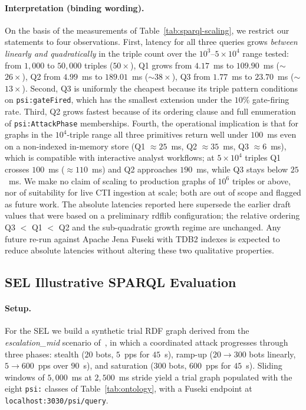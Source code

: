 \documentclass[runningheads]{llncs}
\begin{document}
\paragraph{Interpretation (binding wording).} On the basis of the
measurements of Table~\ref{tab:sparql-scaling}, we restrict our
statements to four observations. First, latency for all three queries
grows \emph{between linearly and quadratically} in the triple count
over the $10^{3}$--$5\times 10^{4}$ range tested: from $1{,}000$ to
$50{,}000$ triples ($50\times$), Q1 grows from $4.17$~ms to
$109.90$~ms ($\sim$$26\times$), Q2 from $4.99$~ms to $189.01$~ms
($\sim$$38\times$), Q3 from $1.77$~ms to $23.70$~ms ($\sim$$13\times$).
Second, Q3 is uniformly the cheapest because its triple pattern
conditions on \texttt{psi:gateFired}, which has the smallest extension
under the $10\%$ gate-firing rate. Third, Q2 grows fastest because of
its ordering clause and full enumeration of \texttt{psi:AttackPhase}
memberships. Fourth, the operational implication is that for graphs in
the $10^{4}$-triple range all three primitives return well under
$100$~ms even on a non-indexed in-memory store (Q1 $\approx 25$~ms,
Q2 $\approx 35$~ms, Q3 $\approx 6$~ms), which is compatible with
interactive analyst workflows; at $5\times 10^{4}$ triples Q1 crosses
$100$~ms ($\approx 110$~ms) and Q2 approaches $190$~ms, while Q3 stays
below $25$~ms. We make no claim of scaling to production graphs of
$10^{6}$ triples or above, nor of suitability for live CTI ingestion at
scale; both are out of scope and flagged as future work. The absolute
latencies reported here supersede the earlier draft values that were
based on a preliminary rdflib configuration; the relative ordering Q3
$<$ Q1 $<$ Q2 and the sub-quadratic growth regime are unchanged.
Any future re-run against Apache Jena Fuseki with TDB2 indexes is
expected to reduce absolute latencies without altering these two
qualitative properties.

\subsection{SEL Illustrative SPARQL Evaluation}
\label{sec:eval-sel}

\paragraph{Setup.} For the SEL we build a synthetic trial RDF graph
derived from the \emph{escalation\_mid} scenario of~\cite{vartic2026},
in which a coordinated attack progresses through three phases: stealth
($20$ bots, $5$~pps for $45$~s), ramp-up ($20\to300$ bots linearly,
$5\to600$~pps over $90$~s), and saturation ($300$ bots, $600$~pps for
$45$~s). Sliding windows of $5{,}000$~ms at $2{,}500$~ms stride yield a
trial graph populated with the eight \texttt{psi:} classes of
Table~\ref{tab:ontology}, with a Fuseki endpoint at
\verb|localhost:3030/psi/query|.
\end{document}
